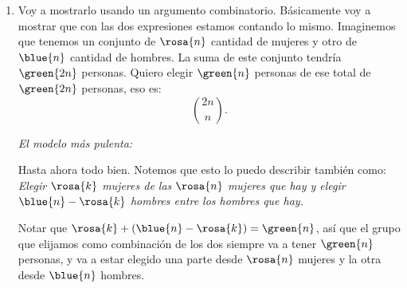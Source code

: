 \begin{enumerate}[label=\alph*)]
  \item
        Voy a mostrarlo usando un argumento combinatorio. Básicamente voy a mostrar que con las dos expresiones estamos contando lo mismo.
        Imaginemos que tenemos un conjunto de $\rosa{n}$ cantidad de mujeres y otro de $\blue{n}$ cantidad de hombres.
        La suma de este conjunto tendría $\green{2n}$ personas. Quiero elegir $\green{n}$ personas de ese total
        de $\green{2n}$ personas, eso es:
        $$
          \binom{2n}{n}.
        $$

        \bigskip


        \bigskip

        \textit{El modelo más pulenta:}

        Hasta ahora todo bien. Notemos que esto lo puedo describir también como:
        \textit{
          Elegir $\rosa{k}$ mujeres de las $\rosa{n}$ mujeres que hay
          y elegir $\blue{n} - \rosa{k}$ hombres entre los  hombres que hay.
        }

        Notar que $\rosa{k} + (\blue{n} - \rosa{k}) = \green{n}$, así que el grupo que elijamos como combinación
        de los dos siempre va a tener $\green{n}$ personas, y va a estar elegido una parte desde $\rosa{n}$ mujeres y la otra desde $\blue{n}$ hombres.


\end{enumerate}
